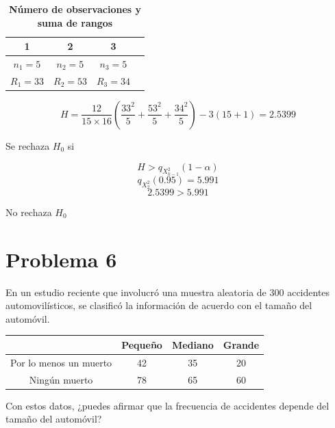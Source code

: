 \documentclass{article}
\begin{document}
\begin{table}[ht]
    \centering
    \caption{\textbf{Número de observaciones y suma de rangos}}
    \begin{tabular}{cccc}
        \toprule
        1          & 2          & 3          \\
        \midrule
        $n_1 = 5$  & $n_2 = 5$  & $n_3 = 5$  \\
        $R_1 = 33$ & $R_2 = 53$ & $R_3 = 34$ \\
        \bottomrule
    \end{tabular}
\end{table}

\[ H = \frac{12}{15 \times 16} \left(\frac{33^2}{5} + \frac{53^2}{5} + \frac{34^2}{5} \right) - 3(15 + 1) = 2.5399 \]

Se rechaza $H_0$ si

\[H > q_{X^{2}_{k-1}}(1 - \alpha)\]
\[q_{X^{2}_{2}}(0.95) = 5.991\]
\[2.5399 > 5.991\]

No rechaza \(H_0\)

\section{Problema 6}
En un estudio reciente que involucró una muestra aleatoria de 300 accidentes automovilísticos, se clasificó la información de acuerdo con el tamaño del automóvil.
\begin{center}
    \begin{tabular}{c| c c c}
                               & Pequeño & Mediano & Grande \\
        \hline
        Por lo menos un muerto & 42      & 35      & 20     \\
        Ningún muerto          & 78      & 65      & 60     \\
    \end{tabular}
\end{center}
Con estos datos,  ¿puedes afirmar que la frecuencia de accidentes depende del  tamaño del automóvil?
\end{document}
